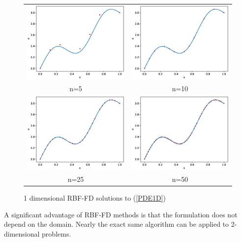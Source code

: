 \documentclass[12pt]{article}
\begin{document}
\begin{figure}[h]
	\caption{1 dimensional RBF-FD solutions to (\ref{PDE1D})}
	\begin{tabular}{cc}
		\includegraphics[width=.4\textwidth]{1D_n5} & \includegraphics[width=.4\textwidth]{1D_n10} \\
		n=5 & n=10 \\
		\includegraphics[width=.4\textwidth]{1D_n25} & \includegraphics[width=.4\textwidth]{1D_n50} \\
		n=25 & n=50
	\end{tabular}
	\label{1Dsolutions}
	\centering
\end{figure}

A significant advantage of RBF-FD methods is that the formulation does not depend on the domain. Nearly the exact same algorithm can be applied to 2-dimensional problems. \bigbreak
\end{document}
